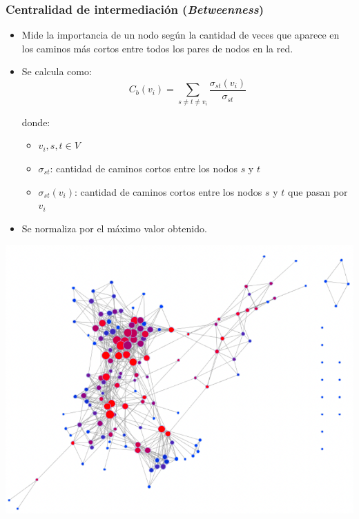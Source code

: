 \documentclass[
10pt, %
aspectratio=169, %
]{beamer}
\begin{document}
	\begin{frame}
		
		\frametitle{Centralidad de intermediación (\emph{Betweenness})}
		
		\begin{minipage}{0.45\textwidth}
			
			\begin{itemize}
				\item Mide la importancia de un nodo según la cantidad de veces que aparece en los caminos más cortos entre todos los pares de nodos en la red.
				
				\item Se calcula como:
				$$C_b(v_i) = \sum_{s \neq t \neq v_i} \frac{\sigma_{st}(v_i)}{\sigma_{st}}$$
				
				donde:
				\begin{itemize}
					\item $v_i, s, t \in V$
					\item $\sigma_{st}$: cantidad de caminos cortos entre los nodos $s$ y $t$ 
					\item $\sigma_{st}(v_i)$: cantidad de caminos cortos entre los nodos $s$ y $t$ que pasan por $v_i$
				\end{itemize}
				
				\item Se normaliza por el máximo valor obtenido.
			\end{itemize}
			
		\end{minipage}%
		\hfill
		\begin{minipage}{0.45\textwidth}
			
			\centering
			\includegraphics[scale=0.35]{centralidad-intermediacion.png}
			
		\end{minipage}%
		
	\end{frame}
	
\end{document}
